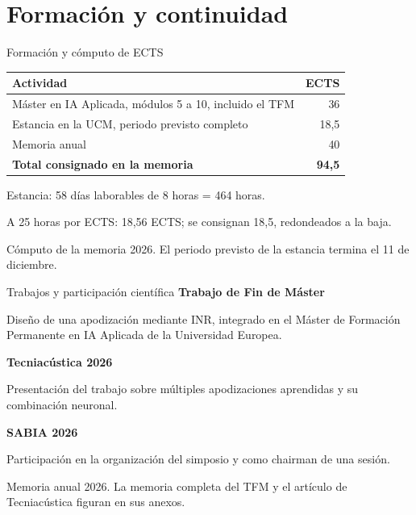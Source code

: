 \documentclass[aspectratio=169,11pt]{beamer}
\newcommand{\source}[1]{{\par\vspace{1mm}\fontsize{7}{8}\selectfont\color{muted}#1\par}}
\begin{document}
\section{Formación y continuidad}
\begin{frame}{Formación y cómputo de ECTS}
\relax
\renewcommand{\arraystretch}{1.5}
\begin{tabular}{@{}>{\raggedright\arraybackslash}p{}r@{}}
\toprule
\textbf{Actividad} & \textbf{ECTS}\\
\midrule
Máster en IA Aplicada, módulos 5 a 10, incluido el TFM & 36\\
Estancia en la UCM, periodo previsto completo & 18,5\\
Memoria anual & 40\\
\midrule
\textbf{Total consignado en la memoria} & \textbf{94,5}\\
\bottomrule
\end{tabular}\par
\par\vspace{4mm}
\small Estancia: 58 días laborables de 8 horas = 464 horas.\par
A 25 horas por ECTS: 18,56 ECTS; se consignan 18,5, redondeados a la baja.
\source{Cómputo de la memoria 2026. El periodo previsto de la estancia termina el 11 de diciembre.}
\end{frame}

\begin{frame}{Trabajos y participación científica}
\relax
\textbf{Trabajo de Fin de Máster}
\par Diseño de una apodización mediante INR, integrado en el Máster de Formación Permanente en IA Aplicada de la Universidad Europea.
\par\vspace{3mm}
\textbf{Tecniacústica 2026}
\par Presentación del trabajo sobre múltiples apodizaciones aprendidas y su combinación neuronal.
\par\vspace{3mm}
\textbf{SABIA 2026}
\par Participación en la organización del simposio y como chairman de una sesión.
\source{Memoria anual 2026. La memoria completa del TFM y el artículo de Tecniacústica figuran en sus anexos.}
\end{frame}
\end{document}
